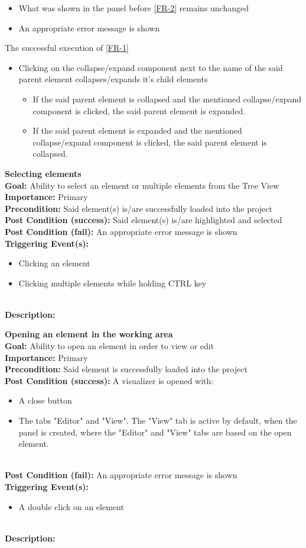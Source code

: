 \documentclass[10pt,a4paper]{report}
\newcommand{\precondition}[1]{
    \textbf{Precondition: } #1 \leavevmode \\
}
\newcommand{\FRDescription}[8]{
    \textbf{#1} \leavevmode \\
    \textbf{Goal: } #2 \leavevmode \\
    \textbf{Importance: } #3 \leavevmode \\
    \precondition{#4}
    \textbf{Post Condition (success): } #5 \leavevmode \\
    \textbf{Post Condition (fail): } #6 \leavevmode \\
    \textbf{Triggering Event(s): } #7 \leavevmode \\
    \textbf{Description: } \leavevmode \\ 
    #8}
\begin{document}
\begin{FR}
{\begin{itemize}
        \item What was shown in the panel before \ref{FR-2} remains unchanged
        \item An appropriate error message is shown
    \end{itemize}}
    {The successful execution of \ref{FR-1}}
    {\begin{itemize}
        \item Clicking on the collapse/expand component next to the name of the said parent element collapses/expands it's child elements
        \begin{itemize}
            \item If the said parent element is collapsed and the mentioned collapse/expand component is clicked, the said parent element is expanded.
            \item If the said parent element is expanded and the mentioned collapse/expand component is clicked, the said parent element is collapsed.
        \end{itemize}
    \end{itemize}}
    \item \FRDescription{Selecting elements}
    {Ability to select an element or multiple elements from the Tree View}
    {Primary}
    {Said element(s) is/are successfully loaded into the project}
    {Said element(s) is/are highlighted and selected}
    {An appropriate error message is shown}
    {\begin{itemize}
                \item Clicking an element
                \item Clicking multiple elements while holding CTRL key
            \end{itemize} }
    \item \FRDescription{Opening an element in the working area}
    {Ability to open an element in order to view or edit}
    {Primary}
    {Said element is successfully loaded into the project}
    {A visualizer is opened with:
    \begin{itemize}
        \item A close button 
        \item The tabs "Editor" and "View". The "View" tab is active by default, when the panel is created, where the "Editor" and "View" tabs are based on the open element.
    \end{itemize}}
    {An appropriate error message is shown}
    {\begin{itemize}
        \item A double click on an element

\end{itemize}}
\end{FR}
\end{document}
